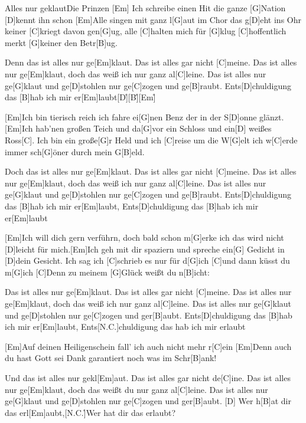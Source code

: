\documentclass[../main.tex]{subfiles}
\begin{document}
\begin{song}{Alles nur geklaut}{Die Prinzen}{}
[Em] \hh [C] \hh [Em] \hh [C] \hh
[Em]Ich schreibe einen Hit die ganze [G]Nation [D]kennt ihn schon
[Em]Alle singen mit ganz l[G]aut im Chor das g[D]eht ins Ohr
keiner [C]kriegt davon gen[G]ug, alle [C]halten mich für [G]klug
[C]hoffentlich merkt [G]keiner den Betr[B]ug.

Denn das ist alles nur ge[Em]klaut. Das ist alles gar nicht [C]meine.
Das ist alles nur ge[Em]klaut, doch das weiß ich nur ganz al[C]leine.
Das ist alles nur ge[G]klaut und ge[D]stohlen nur ge[C]zogen  und ge[B]raubt.
Ents[D]chuldigung das [B]hab ich mir er[Em]laubt[D]{\h}[B]{\h}[Em]{\h}

[Em]Ich bin tierisch reich ich fahre ei[G]nen Benz
der in der S[D]onne glänzt. [Em]Ich hab’nen großen Teich
und da[G]vor ein Schloss und ein[D] weißes Ross[C]. Ich bin ein große[G]r Held
und ich [C]reise um die W[G]elt ich w[C]erde immer sch[G]{ö}ner durch mein G[B]eld.

Doch das ist alles nur ge[Em]klaut. Das ist alles gar nicht [C]meine.
Das ist alles nur ge[Em]klaut, doch das weiß ich nur ganz al[C]leine.
Das ist alles nur ge[G]klaut und ge[D]stohlen nur ge[C]zogen  und ge[B]raubt.
Ents[D]chuldigung das [B]hab ich mir er[Em]laubt, Ents[D]chuldigung das [B]hab ich mir er[Em]laubt

[Em]Ich will dich gern verführn, doch bald schon m[G]erke ich
das wird nicht [D]leicht für mich.[Em]Ich geh mit dir spaziern
und spreche ein[G] Gedicht in [D]dein Gesicht.
Ich sag ich [C]schrieb es nur für d[G]ich  [C]und dann küsst du m[G]ich
[C]Denn zu meinem [G]Glück weißt du n[B]icht:

Das ist alles nur ge[Em]klaut. Das ist alles gar nicht [C]meine.
Das ist alles nur ge[Em]klaut, doch das weiß ich nur ganz al[C]leine.
Das ist alles nur ge[G]klaut und ge[D]stohlen nur ge[C]zogen und ger[B]aubt.
Ents[D]chuldigung das [B]hab ich mir er[Em]laubt, Ents[N.C.]chuldigung das hab ich mir erlaubt

[Em]Auf deinen Heiligenschein fall' ich auch nicht mehr r[C]ein
[Em]Denn auch du hast Gott sei Dank garantiert noch was im Schr[B]ank!

Und das ist alles nur gekl[Em]aut. Das ist alles gar nicht de[C]ine.
Das ist alles nur ge[Em]klaut, doch das weißt du nur ganz al[C]leine.
Das ist alles nur ge[G]klaut und ge[D]stohlen nur ge[C]zogen und ger[B]aubt.
[D] \hh Wer h[B]at dir das erl[Em]aubt,[N.C.]{\h}Wer hat dir das erlaubt?

\end{song}
\end{document}
